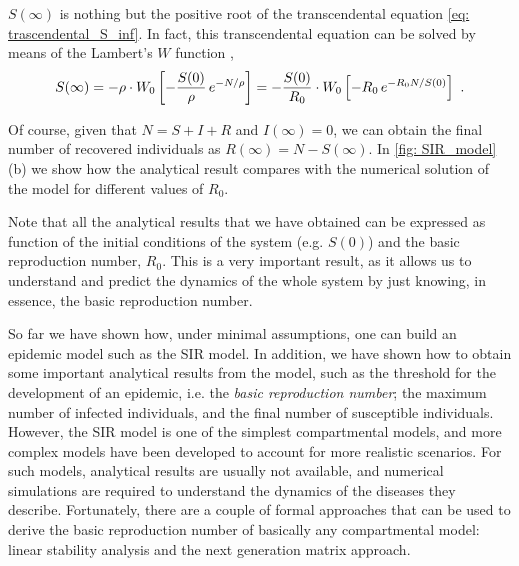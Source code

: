 $S(\infty)$ is nothing but the positive root of the transcendental equation
\cref{eq: trascendental_S_inf}. In fact, this transcendental equation can be
solved by means of the Lambert's $W$ function \cite{Lethonen2016},
\begin{equation}
  S(\infty)=-\rho\cdot W_0\left[-\frac{S(0)}{\rho} \,
    e^{-N/\rho}\right]=-\frac{S(0)}{R_0}\cdot W_0\left[-R_0 \, e^{-R_0N/S(0)}\right] \
  .
\end{equation}

Of course, given that $N=S+I+R$ and $I(\infty)=0$, we can obtain the final
number of recovered individuals as $R(\infty)=N-S(\infty)$. In \cref{fig:
  SIR_model}(b) we show how the analytical result compares with the numerical
solution of the model for different values of $R_0$.

\begin{remark}
  Note that all the analytical results that we have obtained can be expressed
  as function of the initial conditions of the system (e.g. $S(0)$) and the
  basic reproduction number, $R_0$. This is a very important result, as it
  allows us to understand and predict the dynamics of the whole system by just
  knowing, in essence, the basic reproduction number.
\end{remark}


So far we have shown how, under minimal assumptions, one can build an epidemic
model such as the SIR model. In addition, we have shown how to obtain some
important analytical results from the model, such as the threshold for the
development of an epidemic, i.e. the \textit{basic reproduction number}; the
maximum number of infected individuals, and the final number of susceptible
individuals. However, the SIR model is one of the simplest compartmental
models, and more complex models have been developed to account for more
realistic scenarios. For such models, analytical results are usually not
available, and numerical simulations are required to understand the dynamics of
the diseases they describe. Fortunately, there are a couple of formal
approaches that can be used to derive the basic reproduction number of
basically any compartmental model: linear stability analysis and the next
generation matrix approach.

